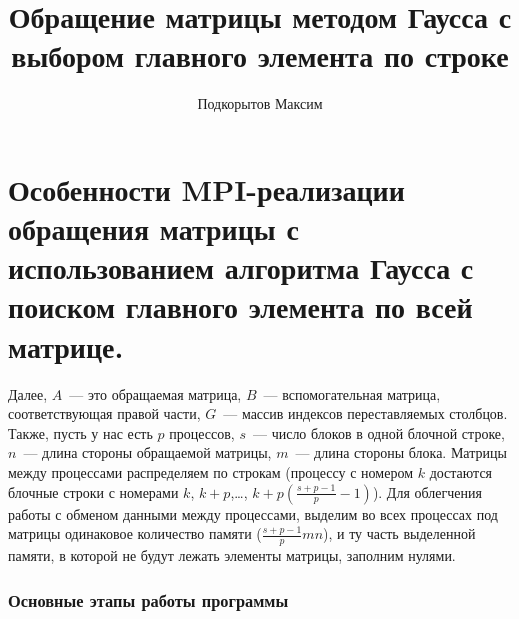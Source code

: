 \documentclass[12pt]{article}
\title{Обращение матрицы методом Гаусса с выбором главного элемента по строке}
\author{Подкорытов Максим}
\begin{document}
\maketitle  

\section{Особенности MPI-реализации обращения матрицы с использованием алгоритма Гаусса с поиском главного элемента по всей матрице.}

Далее, $A$~--- это обращаемая матрица, $B$~--- вспомогательная матрица, соответствующая правой части, $G$~--- массив индексов переставляемых столбцов. Также, пусть у нас есть $p$ процессов, $s$~--- число блоков в одной блочной строке, $n$~--- длина стороны обращаемой матрицы, $m$~--- длина стороны блока. Матрицы между процессами распределяем по строкам (процессу с номером $k$ достаются блочные строки с номерами $k$, $k + p$,\dots, $k + p(\frac{s+p-1}p - 1)$). Для облегчения работы с обменом данными между процессами, выделим во всех процессах под матрицы одинаковое количество памяти ($\frac{s+p-1}pmn$), и ту часть выделенной памяти, в которой не будут лежать элементы матрицы, заполним нулями.

\subsubsection*{Основные этапы работы программы}
\end{document}
